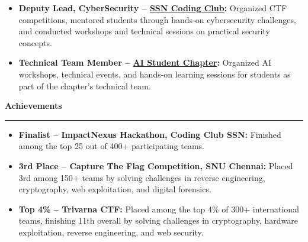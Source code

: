 \documentclass[10pt,a4paper]{article}
\newcommand{\sectionheading}[1]{%
  \par\vspace{3pt}%
  \textbf{\large #1}\\[-8pt]
  \hrule
  \vspace{3pt}%
}
\begin{document}
\begin{itemize}
\item \textbf{Deputy Lead, CyberSecurity -- \href{https://www.linkedin.com/company/ssn-coding-club/home/}{SSN Coding Club}:} Organized CTF competitions, mentored students through hands-on cybersecurity challenges, and conducted workshops and technical sessions on practical security concepts.

\item \textbf{Technical Team Member -- \href{https://www.linkedin.com/company/ssn-ai-student-chapter/home/}{AI Student Chapter}:} Organized AI workshops, technical events, and hands-on learning sessions for students as part of the chapter's technical team.
\end{itemize}

\sectionheading{Achievements}

\begin{itemize}
\item \textbf{Finalist -- ImpactNexus Hackathon, Coding Club SSN:} Finished among the top 25 out of 400+ participating teams.

\item \textbf{3rd Place -- Capture The Flag Competition, SNU Chennai:} Placed 3rd among 150+ teams by solving challenges in reverse engineering, cryptography, web exploitation, and digital forensics.


\item \textbf{Top 4\% -- Trivarna CTF:} Placed among the top 4\% of 300+ international teams, finishing 11th overall by solving challenges in cryptography, hardware exploitation, reverse engineering, and web security.
\end{itemize}
\end{document}
